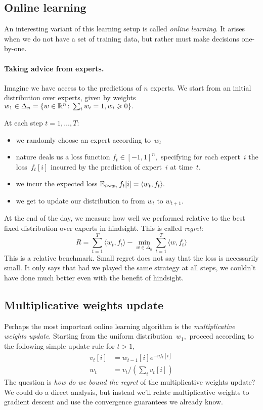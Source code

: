 \subsection{Online learning}

An interesting variant of this learning setup is called \emph{online learning}.
It arises when we do not have a set of training data, but rather must make
decisions one-by-one.

\paragraph{Taking advice from experts.}
Imagine we have access to the predictions of $n$ experts. 
We start from an initial distribution over experts, given by
weights~$w_1\in\Delta_n = \{ w\in\mathbb{R}^n\colon \sum_i w_i=1, w_i\geqslant0\}.$

At each step $t = 1, \ldots, T$:
\begin{itemize}
    \item we randomly choose an expert according to~$w_t$
    \item nature deals us a loss function $f_t\in[-1,1]^n,$ specifying for each
expert~$i$ the loss~$f_t[i]$ incurred by the prediction of expert~$i$ at
time~$t.$
    \item we incur the expected loss $\operatorname*{\mathbb{E}}_{i\sim w_t}f_t[i]=\langle
w_t,f_t\rangle.$
    \item we get to update our distribution to from $w_t$ to $w_{t+1}.$
\end{itemize}

At the end of the day, we measure how well we performed relative to the best
fixed distribution over experts in hindsight. This is called \emph{regret}:
\begin{equation*}
   R = \sum^T_{t = 1} \langle w_{t}, f_t \rangle - \min_{w \in \Delta_n} \sum^{T}_{t = 1} \langle w, f_t \rangle
\end{equation*}
This is a relative benchmark. Small regret does not say that the loss is necessarily
small. It only says that had we played the same strategy at all steps, we
couldn't have done much better even with the benefit of hindsight.

\subsection{Multiplicative weights update}

Perhaps the most important online learning algorithm is the \emph{multiplicative
weights update}. Starting from the uniform distribution~$w_1,$ proceed according
to the following simple update rule for $t>1,$
\begin{align*}
    v_t[i] &= w_{t-1}[i]e^{-\eta f_t[i]} \tag{exponential weights update}\\
    w_t &= v_t/(\textstyle\sum_i v_t[i]) \tag{normalize}
\end{align*}
The question is \textit{how do we bound the regret} of the multiplicative
weights update? We could do a direct analysis, but instead we'll relate
multiplicative weights to gradient descent and use the convergence guarantees
we already know.

